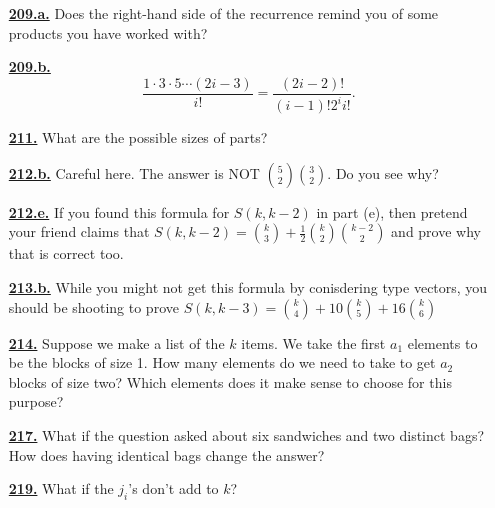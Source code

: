 \documentclass[10pt,]{book}
\theoremstyle{plain}
\theoremstyle{definition}
\theoremstyle{definition}
\theoremstyle{definition}
\numberwithin{equation}{chapter}
\begin{document}
\begin{itemize}[itemsep=1em]
\hypertarget{a-209.a}{}\item[\textbf{\hyperref[task-183]{209.a.}}]
\hypertarget{p-971}{}%
Does the right-hand side of the recurrence remind you of some products you have worked with?%

\hypertarget{a-209.b}{}\item[\textbf{\hyperref[task-184]{209.b.}}]
\hypertarget{p-974}{}%
%
\begin{equation*}
\frac{1\cdot 3\cdot 5\cdots (2i-3)}{i!} = \frac{(2i-2)!}{(i-1)!2^i i!}\text{.}
\end{equation*}
%

\hypertarget{a-211}{}\item[\textbf{\hyperref[activity-211]{211.}}]
\hypertarget{p-983}{}%
What are the possible sizes of parts?%

\hypertarget{a-212.b}{}\item[\textbf{\hyperref[task-186]{212.b.}}]
\hypertarget{p-990}{}%
Careful here.  The answer is NOT \(\binom{5}{2}\binom{3}{2}\).  Do you see why?%

\hypertarget{a-212.e}{}\item[\textbf{\hyperref[task-189]{212.e.}}]
\hypertarget{p-997}{}%
If you found this formula for \(S(k,k-2)\) in part (e), then pretend your friend claims that \(S(k, k-2) = \binom{k}{3} + \frac{1}{2}\binom{k}{2}\binom{k-2}{2}\) and prove why that is correct too.%

\hypertarget{a-213.b}{}\item[\textbf{\hyperref[task-191]{213.b.}}]
\hypertarget{p-1002}{}%
While you might not get this formula by conisdering type vectors, you should be shooting to prove \(S(k, k-3) = \binom{k}{4} + 10 \binom{k}{5} + 16 \binom{k}{6}\)%

\hypertarget{a-214}{}\item[\textbf{\hyperref[partitionsgivenpartsize]{214.}}]
\hypertarget{p-1004}{}%
Suppose we make a list of the \(k\) items. We take the first \(a_1\) elements to be the blocks of size 1. How many elements do we need to take to get \(a_2\) blocks of size two? Which elements does it make sense to choose for this purpose?%

\hypertarget{a-217}{}\item[\textbf{\hyperref[caterer2]{217.}}]
\hypertarget{p-1011}{}%
What if the question asked about six sandwiches and two distinct bags? How does having identical bags change the answer?%

\hypertarget{a-219}{}\item[\textbf{\hyperref[activity-219]{219.}}]
\hypertarget{p-1018}{}%
What if the \(j_i\)'s don't add to \(k\)?%


\end{itemize}
\end{document}
